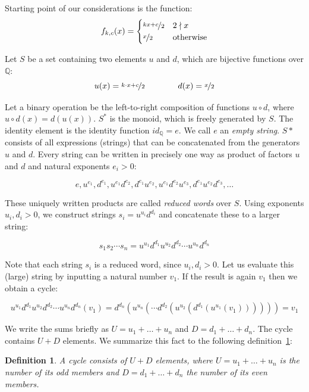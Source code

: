\documentclass[12pt]{amsart}
\newtheorem{definition}[theorem]{Definition}
\theoremstyle{definition}
\begin{document}
Starting point of our considerations is the function:
\begin{equation}
\label{eq:collatz_function}
f_{k,c}(x)=
\begin{cases}
\nicefrac{kx+c}{2}	&	2\nmid x\\
\nicefrac{x}{2}		&	\text{otherwise}
\end{cases}
\end{equation}

Let $S$ be a set containing two elements $u$ and $d$, which are bijective functions over $\mathbb{Q}$:
\begin{equation}
u(x)=\nicefrac{k\cdot x+c}{2}\hspace{4em} d(x)=\nicefrac{x}{2}
\end{equation}

Let a binary operation be the left-to-right composition of functions $u\circ d$, where $u\circ d(x)=d(u(x))$. $S^\ast$ is the monoid, which is freely generated by $S$. The identity element is the identity function $id_{\mathbb{Q}}=e$. We call $e$ an \textit{empty string}. $S*$ consists of all expressions (strings) that can be concatenated from the generators $u$ and $d$. Every string can be written in precisely one way as product of factors $u$ and $d$ and natural exponents $e_i>0$:

\[
e,u^{e_1},d^{e_1},u^{e_1}d^{e_2},d^{e_1}u^{e_2},u^{e_1}d^{e_2}u^{e_3},d^{e_1}u^{e_2}d^{e_3},\ldots
\]

These uniquely written products are called \textit{reduced words} over $S$. Using exponents $u_i,d_i>0$, we construct strings $s_i=u^{u_i}d^{d_i}$ and concatenate these to a larger string:

\[
s_1s_2\cdots s_n=u^{u_1}d^{d_1}u^{u_2}d^{d_2}\cdots u^{u_n}d^{d_n}
\]

Note that each string $s_i$ is a reduced word, since $u_i,d_i>0$. Let us evaluate this (large) string by inputting a natural number $v_1$. If the result is again $v_1$ then we obtain a cycle:

\[
u^{u_1}d^{d_1}u^{u_2}d^{d_2}\cdots u^{u_n}d^{d_n}(v_1)=d^{d_n}(u^{u_n}(\cdots d^{d_2}(u^{u_2}(d^{d_1}(u^{u_1}(v_1))))))=v_1
\]

We write the sums briefly as $U=u_1+\ldots+u_n$ and $D=d_1+\ldots+d_n$. The cycle contains $U+D$ elements. We summarize this fact to the following definition~\ref{def:odd_even_elements}:

\begin{definition}
\label{def:odd_even_elements}
A cycle consists of $U+D$ elements, where $U=u_1+\ldots+u_n$ is the number of its odd members and $D=d_1+\ldots+d_n$ the number of its even members.
\end{definition}
\end{document}
